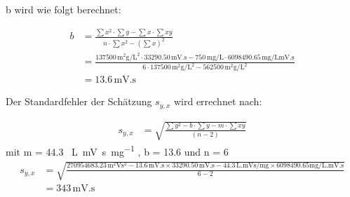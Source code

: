 \documentclass{article}
\begin{document}
  b wird wie folgt berechnet:

\begin{align}
  b &= \frac{\sum x^2 \cdot \sum y - \sum x \cdot \sum x y}{n \cdot \sum x^2 - (\sum x )^2}\\
    & = \frac{\num{137500} \, \si{\square\milli\gram\per\square\liter} \cdot  \num{33290.50} \,  \si{\milli\volt.\second} -   750 \, \si{\milli\gram\per\liter} \cdot  \num{6098490.65} \, \si{\milli\gram\per\liter} \si{\milli\volt.\second}}{6  \cdot \num{137500} \, \si{\square\milli\gram\per\square\liter}  - \num{562500} \, \si{\square\milli\gram\per\square\liter}}\\
    &  = 13.6 \, \si{\milli\volt.\second}
\end{align}



  Der Standardfehler der Schätzung $s_{y,x}$ wird errechnet nach:

\begin{align}
 s_{y,x} &= \sqrt{\frac{\sum y^2 - b \cdot \sum y - m \cdot \sum xy}{(n-2)}}
\end{align}
mit m = 44.3 \, \si{\liter.\milli\volt\second\per\milli\gram} , b = 13.6 und n = 6
\begin{align*}
  s_{y,x} &=\sqrt{ \frac{ \num{270954683.23} \, \si{\square\milli\volt} \si{\square\second} - 13.6 \, \si{\milli\volt.\second} \times \num{33290.50} \, \si{\milli\volt.\second}
   -  44.3 \, \si{\liter.\milli\volt\second\per\milli\gram} \times \num{6098490.65} \si{\milli\gram\per\liter.\milli\volt.\second} } {6-2}} \\
  &= 343 \, \si{\milli\volt.\second}
\end{align*}
\end{document}
